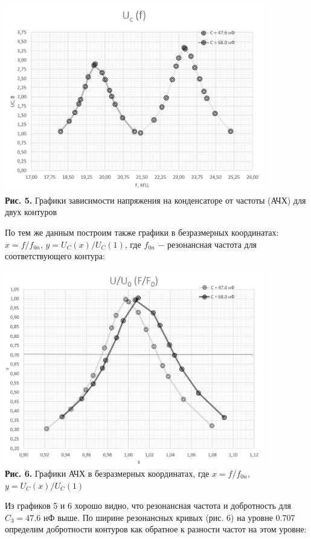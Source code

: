 \documentclass[a4paper,12pt]{article} %
\begin{document}
\begin{center}
\includegraphics[width=0.85\textwidth]{3.2.2_5.png}\\
\textbf{Рис. 5.} Графики зависимости напряжения на конденсаторе от частоты (АЧХ) для двух контуров \\
\end{center}

\hfill \break По тем же данным построим также графики в безразмерных координатах: $x = f/f_{0n}$, $y = U_{C}(x)/U_{C}(1)$, где $f_{0n}$ $-$ резонансная частота для соответствующего контура:

\begin{center}
\includegraphics[width=0.85\textwidth]{3.2.2_6.png}\\
\textbf{Рис. 6.} Графики АЧХ в безразмерных координатах, где $x = f/f_{0n}$, $y = U_{C}(x)/U_{C}(1)$\\
\end{center}

\hfill \break  Из графиков 5 и 6 хорошо видно, что резонансная частота и добротность для $C_{3} = 47.6$ нФ выше. По ширине резонансных кривых (рис. 6) на уровне 0.707 определим добротности контуров как обратное к разности частот на этом уровне: 
\end{document}

